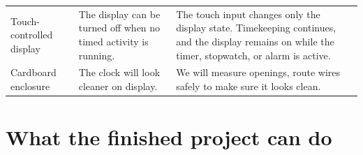 \documentclass[12pt,letterpaper]{article}
\begin{document}
\begin{table}[H]
\begin{tabularx}{
    \textwidth
  }{
    @{}p{34mm}Y Y@{}
  }
    Touch-controlled display
    &
    The display can be turned off when no timed activity is running.
    &
    The touch input changes only the display state. Timekeeping
    continues, and the display remains on while the timer,
    stopwatch, or alarm is active.
    \\

    Cardboard enclosure
    &
    The clock will look cleaner on display.
    &
    We will measure openings,
    route wires safely to make sure it looks clean.
    \\

    \bottomrule

  \end{tabularx}

\end{table}


\clearpage
\section{What the finished project can do}
\end{document}
